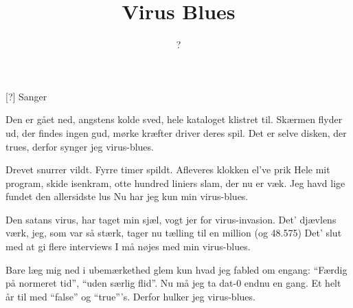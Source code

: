 \documentclass[a4paper,11pt]{article}
\title{Virus Blues}
\author{?}
\begin{document}
\maketitle

\begin{roles}
[?] Sanger
\end{roles}

\begin{song}

Den er gået ned,
angstens  kolde  sved,
hele kataloget klistret til.
Skærmen flyder ud,
der findes ingen gud,
mørke kræfter driver deres spil.
Det er selve disken, der trues,
derfor synger jeg virus-blues.

Drevet snurrer vildt.
Fyrre timer spildt.
Afleveres klokken el've prik
Hele mit program,
skide isenkram,
otte hundred liniers slam, der nu er væk.
Jeg havd lige fundet den allersidste lus
Nu har jeg kun min virus-blues.

Den satans virus,
har taget min sjæl,
vogt jer for virus-invasion.
Det' djævlens værk,
jeg, som var så stærk,
tager nu tælling til en million (og 48.575)
Det' slut med at gi flere interviews
I må nøjes med min virus-blues.

Bare læg mig ned
i ubemærkethed
glem kun hvad jeg fabled om engang:
``Færdig på normeret tid'',
``uden særlig flid''.
Nu må jeg ta dat-0 endnu en gang.
Et helt år til med ``false'' og ``true'''s.
Derfor hulker jeg virus-blues.

\end{song}
\end{document}

